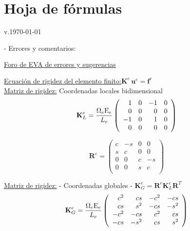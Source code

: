 \newcommand{\mE}{{\rm E}}
\newcommand{\mG}{{\rm G}}

\chapter{Hoja de fórmulas}

\begin{scriptsize}
	\scriptsize{v.\today\date{\today} - Errores y comentarios:}
	\scriptsize{\href{https://eva.fing.edu.uy/mod/forum/view.php?id=67335}{Foro de EVA de errores y sugerencias}}
\end{scriptsize}

\begin{center}
\end{center}

\underline{
	Ecuación de rigidez del elemento finito:}\quad $\textbf{K}^e \,\textbf{u}^e = \textbf{f}^e$\\

\underline{
	Matriz de rigidez:} Coordenadas locales bidimensional
%
\vspace{-0.3cm}
$$
\textbf{K}_ L^e= %
\frac{\Omega_e\mE_e}{L_e}
\left(
\begin{array}{rrrr}
1  & 0 & -1 & 0 \\
0  & 0 &  0 & 0 \\
-1 & 0 &  1 & 0 \\
0  & 0 &  0 & 0 \\
\end{array}
\right)
$$

$$
\textbf{R}^e = %
\left(
\begin{array}{rrrr}
c  & -s &  0 & 0 \\
s  & c &  0 & 0 \\
0  & 0 &  c & -s \\
0  & 0 & s & c \\
\end{array}
\right)
$$

\underline{
	Matriz de rigidez:} - Coordenadas globales - $\textbf{K}_ G^e=\textbf{R}^e \textbf{K}_ L^e\textbf{R}^T$
\vspace{-0.3cm}
$$
\textbf{K}_ G^e= %
\frac{\Omega_e\mE_e}{L_e}
\left(
\begin{array}{rrrr}
c^2  & cs   & -c^2 &  -cs \\
cs  & s^2  &  -cs & -s^2 \\
-c^2  & -cs  &  c^2 &   cs \\
-cs  & -s^2 &   cs &  s^2 \\
\end{array}
\right)
$$

